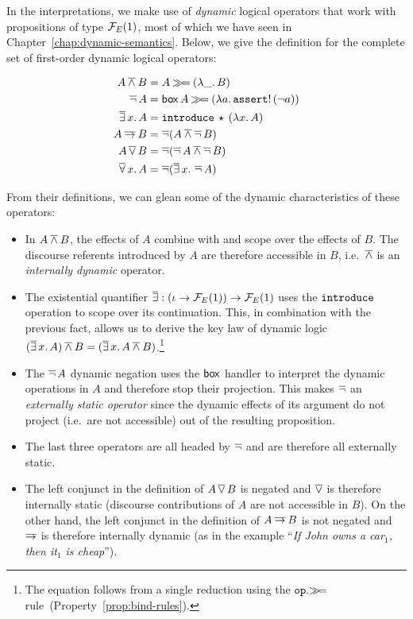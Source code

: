 In the interpretations, we make use of \emph{dynamic} logical operators
that work with propositions of type $\mathcal{F}_E(1)$, most of which we have seen
in Chapter~\ref{chap:dynamic-semantics}. Below, we give the definition for
the complete set of first-order dynamic logical operators:

\begin{align*}
  A \mathbin{\overline{\land}} B &= A \mathbin{\gg\!=} (\lambda \_.\, B) \\
  \mathop{\overline{\lnot}} A &= \mathsf{box}\,A \mathbin{\gg\!=} (\lambda a.\, \mathtt{assert}!\,(\lnot a)) \\
  \mathop{\overline{\exists}} x.\,A &= \mathtt{introduce}\,\star\,(\lambda x.\, A) \\
  A \mathbin{\overline{\to}} B &= \mathop{\overline{\lnot}} (A \mathbin{\overline{\land}} \mathop{\overline{\lnot}} B) \\
  A \mathop{\overline{\lor}} B &= \mathop{\overline{\lnot}} (\mathop{\overline{\lnot}} A \mathbin{\overline{\land}} \mathop{\overline{\lnot}} B) \\
  \mathop{\overline{\forall}} x.\,A &= \mathop{\overline{\lnot}} (\mathop{\overline{\exists}} x.\,\mathop{\overline{\lnot}} A)
\end{align*}

From their definitions, we can glean some of the dynamic characteristics of
these operators:

\begin{itemize}
\item In $A \mathbin{\overline{\land}} B$, the effects of $A$ combine with and scope over the
  effects of $B$. The discourse referents introduced by $A$ are therefore
  accessible in $B$, i.e.\ $\mathbin{\overline{\land}}$ is an \emph{internally dynamic}
  operator.
\item The existential quantifier
  $\mathop{\overline{\exists}} : (\iota \to \mathcal{F}_E(1)) \to \mathcal{F}_E(1)$ uses the $\mathtt{introduce}$
  operation to scope over its continuation. This, in combination with the
  previous fact, allows us to derive the key law of dynamic logic
  $(\mathop{\overline{\exists}} x.\,A) \mathbin{\overline{\land}} B = (\mathop{\overline{\exists}} x.\,A \mathbin{\overline{\land}} B)$.\footnote{The
    equation follows from a single reduction using the $\mathtt{op}.\mathbin{\gg\!=}$
    rule~(Property~\ref{prop:bind-rules}).}
\item The $\mathop{\overline{\lnot}} A$ dynamic negation uses the $\mathsf{box}$ handler to interpret
  the dynamic operations in $A$ and therefore stop their projection. This
  makes $\mathop{\overline{\lnot}}$ an \emph{externally static operator} since the dynamic
  effects of its argument do not project (i.e.\ are not accessible) out of
  the resulting proposition.
\item The last three operators are all headed by $\mathop{\overline{\lnot}}$ and are therefore
  all externally static.
\item The left conjunct in the definition of $A \mathop{\overline{\lor}} B$ is negated and
  $\mathop{\overline{\lor}}$ is therefore internally static (discourse contributions of $A$ are
  not accessible in $B$). On the other hand, the left conjunct in the
  definition of $A \mathbin{\overline{\to}} B$ is not negated and $\mathbin{\overline{\to}}$ is therefore
  internally dynamic (as in the example ``\emph{If John owns a car$_1$,
    then it$_1$ is cheap}'').
\end{itemize}

